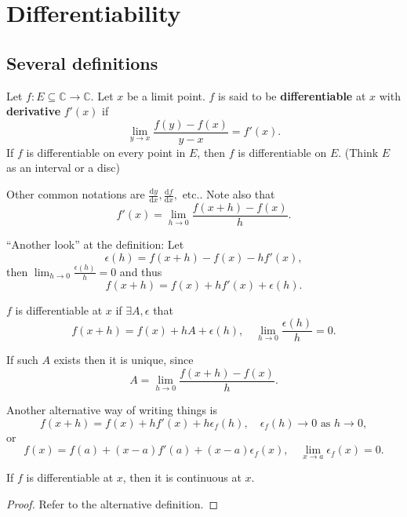 \section{Differentiability}
\subsection{Several definitions}
\begin{definition}
    Let $ f:E \subseteq \mathbb{C} \to \mathbb{C}  $. Let $ x $ be a limit point. $f$ is said to be \textbf{differentiable} at $x$ with \textbf{derivative} $f'(x)$ if 
    \[
        \lim_{y \to x} \frac{f(y)-f(x)}{y-x} = f'(x).
    \]
    If $f$ is differentiable on every point in $E$, then $f$ is differentiable on $E$. (Think $E$ as an interval or a disc)
\end{definition}
\begin{remark}
    Other common notations are $\frac{\mathrm{d}y}{\mathrm{d}x},\frac{\mathrm{d}f}{\mathrm{d}x},\text{ etc.}  $.
    Note also that 
    \[
        f'(x) = \lim_{h \to 0} \frac{f(x+h)-f(x)}{h}.
    \]
\end{remark}
\begin{remark}
    ``Another look'' at the definition: Let 
    \[
        \epsilon(h) = f(x+h)-f(x)-hf'(x),
    \]
    then $ \lim_{h \to 0} \frac{\epsilon(h)}{h}=0 $ and thus 
    \[
        f(x+h) = f(x)+hf'(x)+\epsilon(h).
    \]
\end{remark}
\begin{definition}
    $f$ is differentiable at $x$ if $ \exists A,\epsilon $ that 
    \[
        f(x+h) = f(x)+hA+\epsilon(h),\quad \lim_{h \to 0} \frac{\epsilon(h)}{h}=0.
    \]
\end{definition}
\begin{note}
    If such $A$ exists then it is unique, since 
    \[
        A = \lim_{h \to 0} \frac{f(x+h)-f(x)}{h}.
    \]
\end{note}
\begin{remark}
    Another alternative way of writing things is 
    \[
        f(x+h) = f(x)+hf'(x)+h\epsilon_f(h),\quad \epsilon_f(h)\to 0 \text{ as }h\to 0,
    \]
    or 
    \[
        f(x) = f(a)+(x-a)f'(a)+(x-a)\epsilon_f(x), \quad \lim_{x \to a} \epsilon_f(x)=0.
    \]
\end{remark}
\begin{sprop}
    If $f$ is differentiable at $x$, then it is continuous at $x$. 
\end{sprop}
\begin{proof}
    Refer to the alternative definition.
\end{proof}

